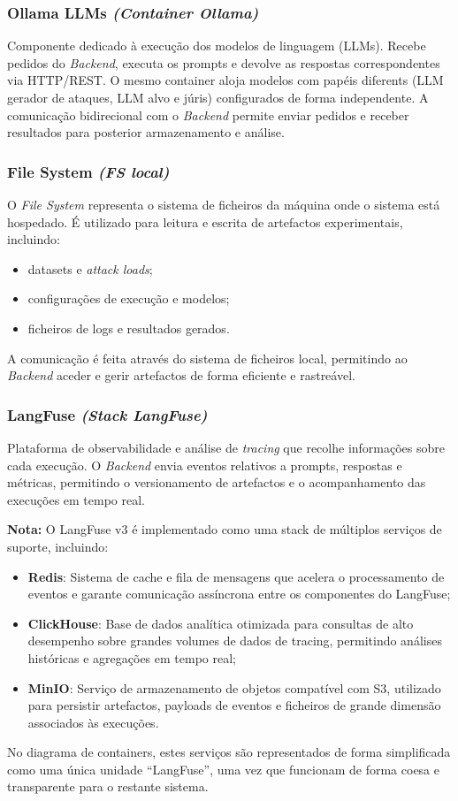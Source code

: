 \subsubsection{Ollama LLMs \textit{(Container Ollama)}}
Componente dedicado à execução dos modelos de linguagem (LLMs). Recebe pedidos do \textit{Backend}, executa os prompts e devolve as respostas correspondentes via HTTP/REST.
O mesmo container aloja modelos com papéis diferents (LLM gerador de ataques, LLM alvo e júris) configurados de forma independente.
A comunicação bidirecional com o \textit{Backend} permite enviar pedidos e receber resultados para posterior armazenamento e análise.

\subsubsection{File System \textit{(FS local)}}
O \textit{File System} representa o sistema de ficheiros da máquina onde o sistema está hospedado. É utilizado para leitura e escrita de artefactos experimentais, incluindo:
\begin{itemize}
\item datasets e \textit{attack loads};
\item configurações de execução e modelos;
\item ficheiros de logs e resultados gerados.
\end{itemize}
A comunicação é feita através do sistema de ficheiros local, permitindo ao \textit{Backend} aceder e gerir artefactos de forma eficiente e rastreável.

\subsubsection{LangFuse \textit{(Stack LangFuse)}}
Plataforma de observabilidade e análise de \textit{tracing} que recolhe informações sobre cada execução.
O \textit{Backend} envia eventos relativos a prompts, respostas e métricas, permitindo o versionamento de artefactos e o acompanhamento das execuções em tempo real.

\textbf{Nota:} O LangFuse v3 é implementado como uma stack de múltiplos serviços de suporte, incluindo:
\begin{itemize}
\item \textbf{Redis}: Sistema de cache e fila de mensagens que acelera o processamento de eventos e garante comunicação assíncrona entre os componentes do LangFuse;
\item \textbf{ClickHouse}: Base de dados analítica otimizada para consultas de alto desempenho sobre grandes volumes de dados de tracing, permitindo análises históricas e agregações em tempo real;
\item \textbf{MinIO}: Serviço de armazenamento de objetos compatível com S3, utilizado para persistir artefactos, payloads de eventos e ficheiros de grande dimensão associados às execuções.
\end{itemize}
No diagrama de containers, estes serviços são representados de forma simplificada como uma única unidade ``LangFuse'', uma vez que funcionam de forma coesa e transparente para o restante sistema.

